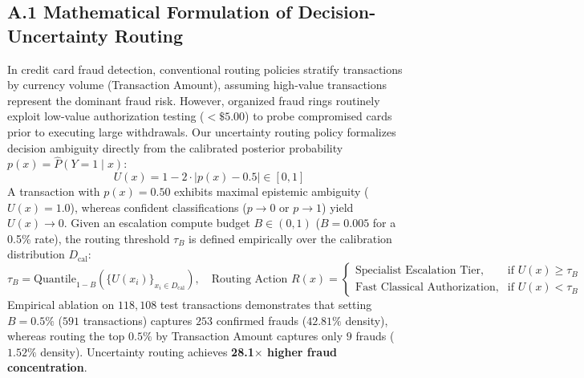 \documentclass[10pt,a4paper]{article}
\begin{document}
\subsection*{A.1 Mathematical Formulation of Decision-Uncertainty Routing}
In credit card fraud detection, conventional routing policies stratify transactions by currency volume (Transaction Amount), assuming high-value transactions represent the dominant fraud risk. However, organized fraud rings routinely exploit low-value authorization testing ($<\$5.00$) to probe compromised cards prior to executing large withdrawals. 
Our uncertainty routing policy formalizes decision ambiguity directly from the calibrated posterior probability $p(x) = \hat{P}(Y=1 \mid x)$:
\begin{equation}
U(x) = 1 - 2 \cdot |p(x) - 0.5| \in [0, 1]
\end{equation}
A transaction with $p(x) = 0.50$ exhibits maximal epistemic ambiguity ($U(x) = 1.0$), whereas confident classifications ($p \rightarrow 0$ or $p \rightarrow 1$) yield $U(x) \rightarrow 0$. Given an escalation compute budget $B \in (0, 1)$ ($B = 0.005$ for a 0.5\% rate), the routing threshold $\tau_B$ is defined empirically over the calibration distribution $D_{\text{cal}}$:
\begin{equation}
\tau_B = \text{Quantile}_{1 - B} \left( \{ U(x_i) \}_{x_i \in D_{\text{cal}}} \right), \quad \text{Routing Action } R(x) = 
\begin{cases}
\text{Specialist Escalation Tier}, & \text{if } U(x) \ge \tau_B \\
\text{Fast Classical Authorization}, & \text{if } U(x) < \tau_B
\end{cases}
\end{equation}
Empirical ablation on $118,108$ test transactions demonstrates that setting $B = 0.5\%$ ($591$ transactions) captures $253$ confirmed frauds ($42.81\%$ density), whereas routing the top $0.5\%$ by Transaction Amount captures only $9$ frauds ($1.52\%$ density). Uncertainty routing achieves \textbf{28.1$\times$ higher fraud concentration}.
\end{document}
